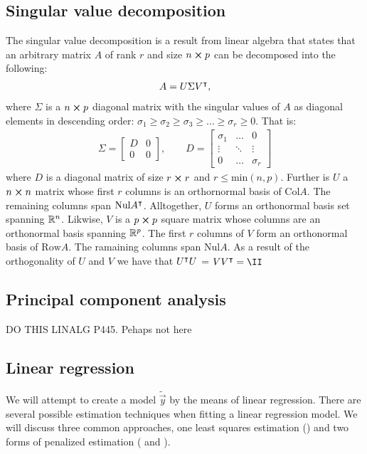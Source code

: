 \subsection{Singular value decomposition}\label{sec:SVD}
    The singular value decomposition is a result from linear algebra that states that an arbitrary matrix $A$ of rank $r$ and size $n\cross p$ can be decomposed into the following\cite{svd}:
    \begin{align}\label{eq:svd}
        A = U\Sigma V\TT,
    \end{align}
    where $\Sigma$ is a $n\cross p$ diagonal matrix with the singular values of $A$ as diagonal elements in descending order: $\sigma_1\geq\sigma_2\geq\sigma_3\geq\dots\geq\sigma_r\geq 0$. That is:
    \begin{align*}
        \Sigma = 
        \begin{bmatrix}
            D & 0 \\
            0 & 0
        \end{bmatrix},
        \quad\quad D = 
        \begin{bmatrix}
            \sigma_1 & \dots & 0 \\
            \vdots & \ddots & \vdots \\
            0 & \dots & \sigma_r
        \end{bmatrix}
    \end{align*}
    where $D$ is a diagonal matrix of size $r\cross r$ and $r\leq \text{min}(n,p)$. Further is $U$ a $n\cross n$ matrix whose first $r$ columns is an orthornormal basis of $\text{Col}A$. The remaining columns span $\text{Nul}A\TT$. Alltogether, $U$ forms an orthonormal basis set spanning $\RR[n]$. Likwise, $V$ is a $p\cross p$ square matrix whose columns are an orthonormal basis spanning $\RR[p]$. The first $r$ columns of $V$ form an orthonormal basis of $\text{Row} A$. The ramaining columns span $\text{Nul}A$. As a result of the orthogonality of $U$ and $V$ we have that $U\TT U$ = $VV\TT = \II$

\subsection{Principal component analysis}\label{sec:principal_comp}
DO THIS LINALG P445.  Pehaps not here

\subsection{Linear regression}\label{sec:regression}
We will attempt to create a model $\tilde{\vec{y}}$ by the means of linear regression. 
There are several possible estimation techniques when fitting a linear regression model. We will discuss three common approaches, one least squares estimation () and two forms of penalized estimation ( and ).

